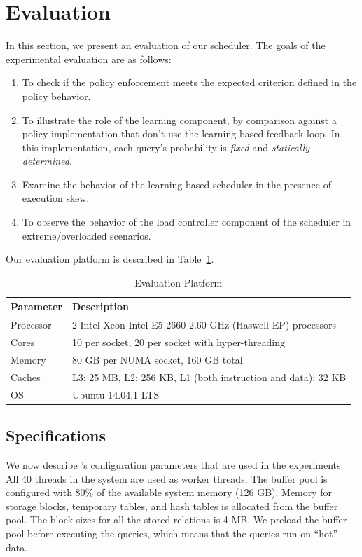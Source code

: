 \section{Evaluation}\label{sec:eval}
In this section, we present an evaluation of our scheduler. 
The goals of the experimental evaluation are as follows:
\begin{enumerate}
\item To check if the policy enforcement meets the expected criterion defined in 
the policy behavior. 
\item To illustrate the role of the learning component, by comparison against a policy implementation that don't use the learning-based feedback loop. 
In this implementation, each query's probability is \textit{fixed} and \textit{statically determined}.
\item Examine the behavior of the learning-based scheduler in the presence of 
execution skew. 
\item To observe the behavior of the load controller component of the scheduler in extreme/overloaded scenarios.
\end{enumerate}

Our evaluation platform is described in Table~\ref{table:hardware}.

\begin{table}[]
\centering
\begin{tabular}{|p{1cm}|p{6.9cm}|}
\hline
\textbf{Parameter} & \textbf{Description} \\ \hline
Processor & 2 Intel Xeon Intel E5-2660 2.60 GHz (Haswell EP) processors\\ \hline
Cores & 10 per socket, 20 per socket with hyper-threading \\ \hline
Memory & 80 GB per NUMA socket, 160 GB total \\ \hline
Caches & L3: 25 MB, L2: 256 KB, L1 (both instruction and data): 32 KB \\ \hline
OS & Ubuntu 14.04.1 LTS \\ \hline
\end{tabular}
\caption{Evaluation Platform}
\label{table:hardware}
\vspace{-2.5em}
\end{table}
\subsection{\sys{} Specifications}
We now describe \sys{}'s configuration parameters that are  used in the experiments. 
All 40 threads in the system are used as worker threads.
The buffer pool is configured with 80\% of the available system memory (126 GB). 
Memory for storage blocks, temporary tables, and hash tables is allocated from the buffer 
pool.
The block sizes for all the stored relations is 4 MB.
We preload the buffer pool before executing the queries, which means that the queries run on ``hot'' data. 

